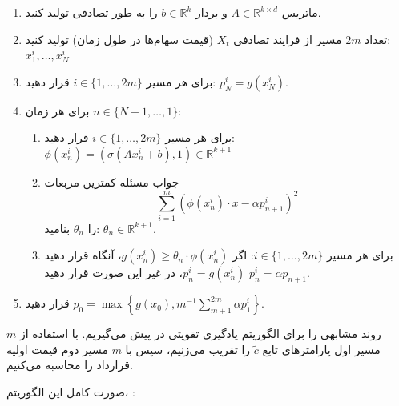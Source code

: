 \documentclass[hidelinks, 11pt]{article}
\begin{document}
\begin{enumerate}[1:]
\item

 ماتریس \(A\in\mathbb{R}^{k\times d}\) و بردار \(b\in\mathbb{R}^{k}\)
  را به طور تصادفی تولید کنید.

\item

 تعداد \(2m\) مسیر از فرایند تصادفی \(X_{t}\) (قیمت سهام‌ها در طول زمان)
  تولید کنید: \(x_{1}^{i},\dots,x_{N}^{i}\)

\item

 برای هر مسیر \(i\in\{1,\dots,2m\}\) قرار دهید: \(p_{N}^{i}=g(x_{N}^{i})\).

\item

 برای هر زمان \(n\in\{N-1,\dots,1\}\):

  \begin{enumerate}[a:]
  \item

 برای هر مسیر \(i\in\{1,\dots,2m\}\) قرار دهید:
    \(\phi(x_{n}^{i})=(\sigma(Ax_{n}^{i}+b),1)\in\mathbb{R}^{k+1}\)

  \item

  جواب مسئله کمترین مربعات
  \begin{equation*}
  	\sum_{i=1}^{m} \left(\phi(x_{n}^{i}) \cdot x - \alpha p_{n+1}^{i}\right)^{2}
  \end{equation*}
  را \(\theta_{n}\) بنامید: \(\theta_{n}\in\mathbb{R}^{k+1}\).

  \item

 برای هر مسیر \(i\in\{1,\dots,2m\}\): اگر
    \(g(x_{n}^{i})\geq\theta_{n}\cdot\phi(x_{n}^{i})\)، آنگاه قرار دهید
    \(p_{n}^{i}=g(x_{n}^{i})\)، در غیر این صورت قرار دهید
    \(p_{n}^{i}=\alpha p_{n+1}\).
  \end{enumerate}

\item

 قرار دهید \(p_{0}=\max\left\{g(x_{0}),m^{-1}\sum_{m+1}^{2m}\alpha p_{1}^{i}\right\}\).

\end{enumerate}

روند مشابهی را برای الگوریتم یادگیری تقویتی در پیش می‌گیریم.   با استفاده
از \(m\) مسیر اول پارامترهای تابع \(\widetilde{c}\) را تقریب می‌زنیم، سپس
با \(m\) مسیر دوم قیمت اولیه قرارداد را محاسبه می‌کنیم.

صورت کامل این الگوریتم،
:
\end{document}
